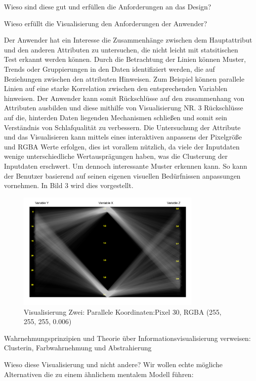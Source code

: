 \documentclass[usegeometry=true]{scrartcl}
\begin{document}
Wieso sind diese gut und erfüllen die Anforderungen an das Design?



Wieso erfüllt die Visualisierung den Anforderungen der Anwender?

 Der Anwender hat ein Interesse die Zusammenhänge zwischen dem Hauptattribut und den anderen Attributen zu untersuchen, die nicht leicht mit statsitischen Test erkannt werden können.
  Durch die Betrachtung der Linien können Muster, Trends oder Gruppierungen in den Daten identifiziert werden, die auf Beziehungen zwischen den attributen Hinweisen.
  Zum Beispiel können parallele Linien auf eine starke Korrelation zwischen den entsprechenden Variablen hinweisen. 
  Der Anwender kann somit Rückschlüsse auf den zusammenhang von Attributen ausbilden und diese mithilfe von Visualisierung NR. 3 
  Rückschlüsse auf die, hinterden Daten liegenden Mechanismen schließen und somit sein Verständnis von Schlafqualität zu verbessern.
 Die Untersuchung der Attribute und das Visualisieren kann mittels eines interaktiven anpassens der Pixelgröße und RGBA Werte erfolgen, dies ist vorallem nützlich, da viele der Inputdaten wenige unterschiedliche Wertausprägungen haben, was die Clusterung der Inputdaten erschwert. Um dennoch interessante Muster erkennen kann. So kann der Benutzer basierend auf seinen eigenen visuellen Bedürfnissen anpassungen vornehmen. In Bild 3 wird dies vorgestellt.
 
\begin{figure}[h]
  \centering
  \includegraphics [width = 0.8\textwidth]{ParalleleBSPPixel.JPG}
  \caption{Visualisierung Zwei: Parallele Koordinaten:Pixel 30, RGBA (255, 255, 255, 0.006) }
\end{figure}
Wahrnehmungsprinzipien und Theorie über Informationsvisualisierung verweisen:
Clusterin, Farbwahrnehmung  und Abstrahierung


Wieso diese Visualisierung und nicht andere? Wir wollen echte mögliche 
Alternativen die zu einem ähnlichem mentalem Modell führen: 
\end{document}

